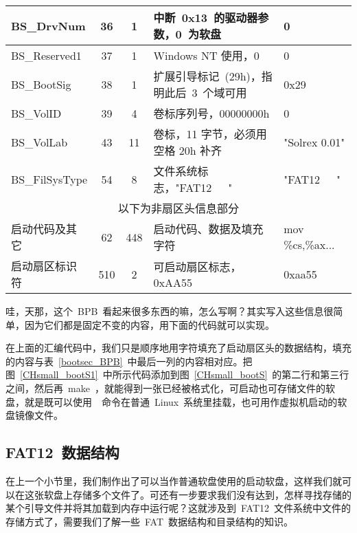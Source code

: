 {\begin{center}
\begin{longtable}{l|c|c|l|l}
\hline
BS\_DrvNum      & 36 &  1 & 中断~0x13~的驱动器参数，0~为软盘        & 0\\
\hline
BS\_Reserved1   & 37 &  1 & Windows NT 使用，0                      & 0\\
\hline
BS\_BootSig     & 38 &  1 & 扩展引导标记~(29h)，指明此后~3~个域可用 & 0x29\\
\hline
BS\_VolID       & 39 &  4 & 卷标序列号，00000000h                   & 0\\
\hline
BS\_VolLab      & 43 & 11 & 卷标，11 字节，必须用空格 20h 补齐      & "Solrex 0.01"\\
\hline
BS\_FilSysType  & 54 &  8 & 文件系统标志，"FAT12~~~"                & "FAT12~~~"\\
\hline
\multicolumn{5}{c}{以下为非扇区头信息部分}\\
\hline
启动代码及其它  & 62 & 448 & 启动代码、数据及填充字符               & mov \%cs,\%ax...\\
\hline
启动扇区标识符  & 510 &  2 & 可启动扇区标志，0xAA55                 & 0xaa55\\
\hline
\end{longtable}\end{center}
}

哇，天那，这个~BPB~看起来很多东西的嘛，怎么写啊？其实写入这些信息很简单，因为它们都是固定不变的内容，用下面的代码就可以实现。

\label{CHsmall_bootS1}

在上面的汇编代码中，我们只是顺序地用字符填充了启动扇区头的数据结构，填充的内容与表~\ref{bootsec_BPB}~中最后一列的内容相对应。把图~\ref{CHsmall_bootS1}~中所示代码添加到图~\ref{CHsmall_bootS}~的第二行和第三行之间，然后再~make~，就能得到一张已经被格式化，可启动也可存储文件的软盘，就是既可以使用~~命令在普通~Linux~系统里挂载，也可用作虚拟机启动的软盘镜像文件。

\subsection{FAT12~数据结构}

在上一个小节里，我们制作出了可以当作普通软盘使用的启动软盘，这样我们就可以在这张软盘上存储多个文件了。可还有一步要求我们没有达到，怎样寻找存储的某个引导文件并将其加载到内存中运行呢？这就涉及到~FAT12~文件系统中文件的存储方式了，需要我们了解一些~FAT~数据结构和目录结构的知识。

